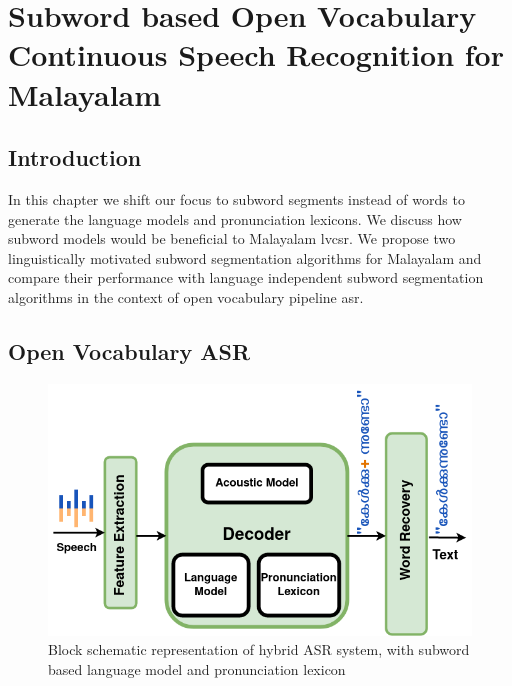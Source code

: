 \chapter{Subword based Open Vocabulary Continuous Speech Recognition for Malayalam}
\label{ch:openvocab} 
\graphicspath{{Figures/chapter6-SubwordLM}}%

\section{Introduction}

In this chapter we shift our focus to subword segments instead of words to generate the language models and pronunciation lexicons. We discuss how subword models would be beneficial to Malayalam \gls{lvcsr}. We propose two linguistically motivated subword segmentation algorithms for Malayalam and compare their performance with language independent subword segmentation algorithms in the context of open vocabulary pipeline \gls{asr}. 

\section{Open Vocabulary ASR}

\begin{figure}[htpb]
    \centering
    \includegraphics[width=0.8\linewidth]{ASR-subword.png}
    \caption{Block schematic representation of hybrid ASR system, with subword based language model and pronunciation lexicon}
    \label{fig:asr-subword}
\end{figure}

